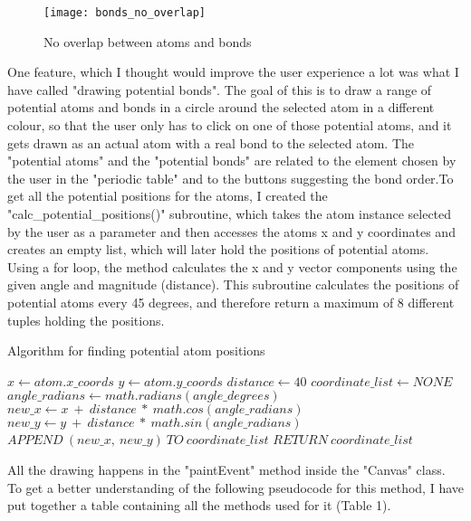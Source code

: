 \documentclass[a4paper,12pt]{article}
\begin{document}
\newpage

\begin{figure} [h]
	\centering
	\texttt{[image: bonds\_no\_overlap]}
	\caption{No overlap between atoms and bonds}
	\label{fig:bonds_no_overlap}
\end{figure}

One feature, which I thought would improve the user experience a lot was what I have called "drawing potential bonds". The goal of this is to draw a range of potential atoms and bonds in a circle around the selected atom in a different colour, so that the user only has to click on one of those potential atoms, and it gets drawn as an actual atom with a real bond to the selected atom. The "potential atoms" and the "potential bonds" are related to the element chosen by the user in the "periodic table" and to the buttons suggesting the bond order.To get all the potential positions for the atoms, I created the "calc\_potential\_positions()" subroutine, which takes the atom instance selected by the user as a parameter and then accesses the atoms x and y coordinates and creates an empty list, which will later hold the positions of potential atoms. Using a for loop, the method calculates the x and y vector components using the given angle and magnitude (distance). This subroutine calculates the positions of potential atoms every 45 degrees, and therefore return a maximum of 8 different tuples holding the positions.

\begin{algorithm}
\footnotesize
\caption{Algorithm for finding potential atom positions}\label{alg:cap}
\begin{algorithmic}
\State $ x\gets atom.x\_coords$
\State $ y\gets atom.y\_coords$
\State $ distance\gets 40$
\State $ coordinate\_list\gets NONE$
	\State $ angle\_radians\gets math.radians(angle\_degrees)$
	\State $ new\_x\gets x\ +\ distance\ *\ math.cos(angle\_radians)$
	\State $ new\_y\gets y\ +\ distance\ *\ math.sin(angle\_radians)$
	\State $ APPEND\ (new\_x,\ new\_y)\ TO\ coordinate\_list$
\EndFor
\State $ RETURN\ coordinate\_list$
\EndFunction
\end{algorithmic}
\end{algorithm}

All the drawing happens in the "paintEvent" method inside the "Canvas" class. To get a better understanding of the following pseudocode for this method, I have put together a table containing all the methods used for it (Table 1).
\end{document}
